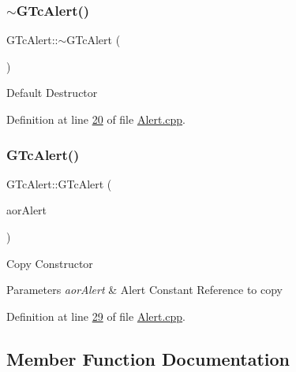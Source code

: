 \subsubsection{\texorpdfstring{$\sim$\+G\+Tc\+Alert()}{~GTcAlert()}}
{\footnotesize\ttfamily G\+Tc\+Alert\+::$\sim$\+G\+Tc\+Alert (\begin{DoxyParamCaption}\item[{void}]{ }\end{DoxyParamCaption})}

Default Destructor 

Definition at line \mbox{\hyperlink{_alert_8cpp_source_l00020}{20}} of file \mbox{\hyperlink{_alert_8cpp_source}{Alert.\+cpp}}.

\mbox{\label{class_g_n_common_1_1_g_n_notification_1_1_g_tc_alert_a90f33fbcc71ed945ab1a0dee83bd3ccc}} 
\subsubsection{\texorpdfstring{G\+Tc\+Alert()}{GTcAlert()}\hspace{0.1cm}{\footnotesize\ttfamily [2/2]}}
{\footnotesize\ttfamily G\+Tc\+Alert\+::\+G\+Tc\+Alert (\begin{DoxyParamCaption}\item[{const \mbox{\hyperlink{class_g_n_common_1_1_g_n_notification_1_1_g_tc_alert}{G\+Tc\+Alert}} \&}]{aor\+Alert }\end{DoxyParamCaption})}

Copy Constructor 
\begin{DoxyParams}{Parameters}
{\em aor\+Alert} & Alert Constant Reference to copy \\
\hline
\end{DoxyParams}


Definition at line \mbox{\hyperlink{_alert_8cpp_source_l00029}{29}} of file \mbox{\hyperlink{_alert_8cpp_source}{Alert.\+cpp}}.



\subsection{Member Function Documentation}
\mbox{\label{class_g_n_common_1_1_g_n_notification_1_1_g_tc_alert_adcde6f9412623e28a38d06aab8379b41}} 

